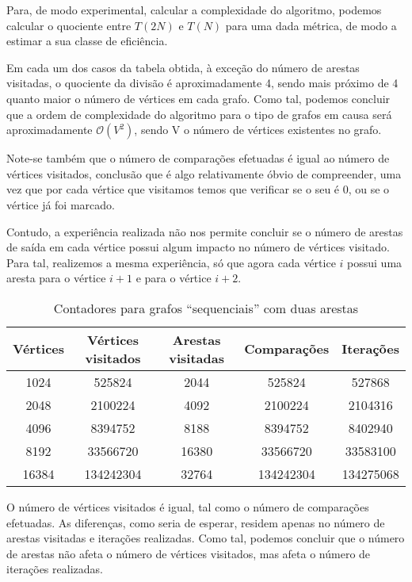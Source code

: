 Para, de modo experimental, calcular a complexidade do algoritmo,
podemos calcular o quociente entre $T(2N)$ e $T(N)$ para uma dada métrica,
de modo a estimar a sua classe de eficiência.

Em cada um dos casos da tabela obtida, à exceção do número de arestas
visitadas, o quociente da divisão é aproximadamente 4,
sendo mais próximo de 4 quanto maior o número de vértices em cada
grafo. Como tal, podemos concluir que
a ordem de complexidade do algoritmo para o tipo de grafos em
causa será aproximadamente $\mathcal{O}\left( V^2 \right)$, sendo V o número de
vértices existentes no grafo.

Note-se também que o número de comparações efetuadas é igual ao
número de vértices visitados, conclusão que é algo relativamente
óbvio de compreender, uma vez que por cada vértice que visitamos
temos que verificar se o seu  é 0, ou se o vértice
já foi marcado.

Contudo, a experiência realizada não nos permite concluir se o
número de arestas de saída em cada vértice possui algum impacto
no número de vértices visitado. Para tal, realizemos a mesma
experiência, só que agora cada vértice $i$ possui uma aresta para
o vértice $i + 1$ e para o vértice $i + 2$.

\begin{table}[H]
	\centering
	\begin{tabular}{| c || c | c | c | c |}
		\hline
		Vértices & Vértices visitados & Arestas visitadas & Comparações & Iterações \\
		\hline\hline
		1024     & 525824             & 2044              & 525824      & 527868    \\
		2048     & 2100224            & 4092              & 2100224     & 2104316   \\
		4096     & 8394752            & 8188              & 8394752     & 8402940   \\
		8192     & 33566720           & 16380             & 33566720    & 33583100  \\
		16384    & 134242304          & 32764             & 134242304   & 134275068 \\
		\hline
	\end{tabular}
	\caption{Contadores para grafos \enquote{sequenciais} com duas arestas}
	\label{1-3}
\end{table}

O número de vértices visitados é igual, tal como o número de
comparações efetuadas. As diferenças, como seria de esperar, residem
apenas no número de arestas visitadas e iterações realizadas.
Como tal, podemos concluir que o número de arestas não afeta o número de
vértices visitados, mas afeta o número de iterações realizadas.

